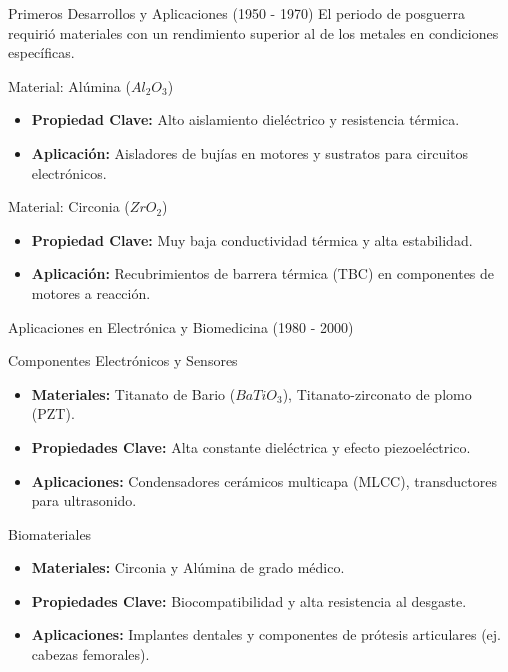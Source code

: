 \begin{frame}{Primeros Desarrollos y Aplicaciones (1950 - 1970)}
  El periodo de posguerra requirió materiales con un rendimiento superior al de
	los metales en condiciones específicas.
  
  \begin{block}{Material: Alúmina ($Al_2O_3$)}
    \begin{itemize}
      \item \textbf{Propiedad Clave:} Alto aislamiento dieléctrico y 
				resistencia térmica.
      \item \textbf{Aplicación:} Aisladores de bujías en motores y sustratos 
				para circuitos electrónicos.
    \end{itemize}
  \end{block}
  
  \begin{block}{Material: Circonia ($ZrO_2$)}
    \begin{itemize}
      \item \textbf{Propiedad Clave:} Muy baja conductividad térmica y alta estabilidad.
      \item \textbf{Aplicación:} Recubrimientos de barrera térmica (TBC) en componentes de motores a reacción.
    \end{itemize}
  \end{block}
\end{frame}


\begin{frame}{Aplicaciones en Electrónica y Biomedicina (1980 - 2000)}
  \begin{block}{Componentes Electrónicos y Sensores}
    \begin{itemize}
      \item \textbf{Materiales:} Titanato de Bario ($BaTiO_3$), 
				Titanato-zirconato de plomo (PZT).
      \item \textbf{Propiedades Clave:} Alta constante dieléctrica y efecto 
				piezoeléctrico.
      \item \textbf{Aplicaciones:} Condensadores cerámicos multicapa (MLCC), 
				transductores para ultrasonido.
    \end{itemize}
  \end{block}

  \begin{block}{Biomateriales}
    \begin{itemize}
      \item \textbf{Materiales:} Circonia y Alúmina de grado médico.
      \item \textbf{Propiedades Clave:} Biocompatibilidad y alta resistencia al 
				desgaste.
      \item \textbf{Aplicaciones:} Implantes dentales y componentes de prótesis 
				articulares (ej. cabezas femorales).
    \end{itemize}
  \end{block}
\end{frame}


